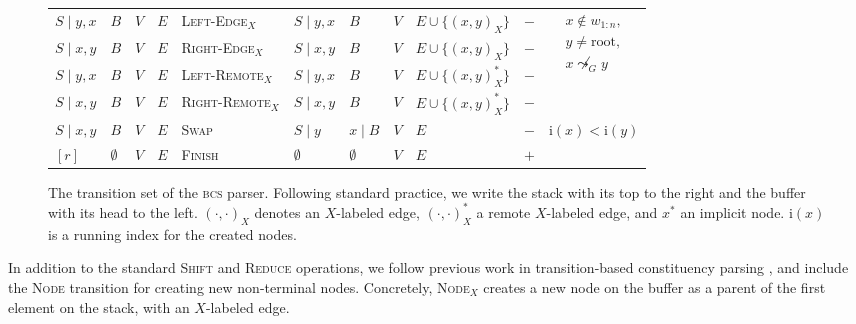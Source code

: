 \documentclass[11pt]{article}
\begin{document}
\begin{figure*}
\begin{adjustbox}{width=\textwidth,margin=3pt,frame}
\begin{tabular}{llll|l|llllc|c}
\cline{11-11}
$S \;|\; y,x$ & $B$ & $V$ & $E$ & \textsc{Left-Edge$_X$} & $S \;|\; y,x$ & $B$ & $V$ & $E \cup \{ (x,y)_X \}$ & $-$ &
\multirow{4}{50pt}{$\begin{aligned}
x \not\in w_{1:n},\\
y \neq \mathrm{root},\\
x \not\leadsto_G y
\end{aligned}$} \\
$S \;|\; x,y$ & $B$ & $V$ & $E$ & \textsc{Right-Edge$_X$} & $S \;|\; x,y$ & $B$ & $V$ & $E \cup \{ (x,y)_X \}$ & $-$ & \\
$S \;|\; y,x$ & $B$ & $V$ & $E$ & \textsc{Left-Remote$_X$} & $S \;|\; y,x$ & $B$ & $V$ & $E \cup \{ (x,y)_X^* \}$ & $-$ & \\
$S \;|\; x,y$ & $B$ & $V$ & $E$ & \textsc{Right-Remote$_X$} & $S \;|\; x,y$ & $B$ & $V$ & $E \cup \{ (x,y)_X^* \}$ & $-$ & \\
\cline{11-11}
$S \;|\; x,y$ & $B$ & $V$ & $E$ & \textsc{Swap} & $S \;|\; y$ & $x \;|\; B$ & $V$ & $E$ & $-$ &
$\mathrm{i}(x) < \mathrm{i}(y)$ \\
\cline{11-11}
$[r]$ & $\emptyset$ & $V$ & $E$ & \textsc{Finish} & $\emptyset$ & $\emptyset$ & $V$ & $E$ & $+$ & \\
\end{tabular}
\end{adjustbox}
\caption{\label{fig:transitions}
  The transition set of the \textsc{bcs} parser. Following standard practice,
  we write the stack with its top to the right and the buffer with its head to the left.
  $(\cdot,\cdot)_X$ denotes an $X$-labeled edge, $(\cdot,\cdot)_X^*$ a remote $X$-labeled edge,
  and $x^*$ an implicit node. $\mathrm{i}(x)$ is a running index for the created nodes.
}
\end{figure*}

In addition to the standard \textsc{Shift} and \textsc{Reduce} operations, 
we follow previous work in transition-based constituency parsing \cite{zhu2013fast}, and include the \textsc{Node} transition for creating new non-terminal nodes.
Concretely, \textsc{Node$_X$} creates a new node on the buffer as a parent of the first element on the stack, with an $X$-labeled edge.
\end{document}

